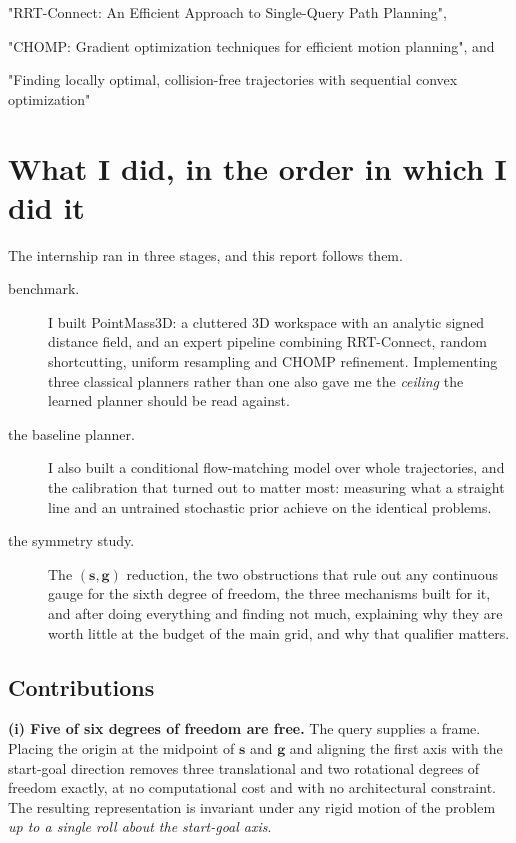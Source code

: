 \documentclass[11pt,a4paper]{article}
\newcommand{\svec}{\mathbf{s}}
\newcommand{\gvec}{\mathbf{g}}
\begin{document}
"RRT-Connect: An Efficient Approach to Single-Query Path Planning", 

"CHOMP: Gradient optimization techniques for efficient motion planning", and 

"Finding locally optimal, collision-free trajectories with sequential convex optimization"

\section{What I did, in the order in which I did it}

The internship ran in three stages, and this report follows them.

\begin{description}
  \item[benchmark.] I built PointMass3D: a cluttered 3D
  workspace with an analytic signed distance field, and an expert pipeline
  combining RRT-Connect, random shortcutting, uniform resampling and CHOMP
  refinement. Implementing three classical planners rather than one also gave me
  the \emph{ceiling} the learned planner should be read against.
  \item[the baseline planner.] I also built a conditional flow-matching model
  over whole trajectories, and the calibration that turned out to matter most:
  measuring what a straight line and an untrained stochastic prior achieve on
  the identical problems.
  \item[the symmetry study.] The $(\svec,\gvec)$ reduction, the two
  obstructions that rule out any continuous gauge for the sixth degree of
  freedom, the three mechanisms built for it, and after doing everything and finding not much, explaining why they are
  worth little at the budget of the main grid, and why that qualifier matters.
\end{description}

\subsection{Contributions}


\textbf{(i) Five of six degrees of freedom are free.} The query supplies a frame.
Placing the origin at the midpoint of $\svec$ and $\gvec$ and aligning the first
axis with the start-goal direction removes three translational and two rotational
degrees of freedom exactly, at no computational cost and with no architectural
constraint. The resulting representation is invariant under any rigid motion of
the problem \emph{up to a single roll about the start-goal axis}.
\end{document}
